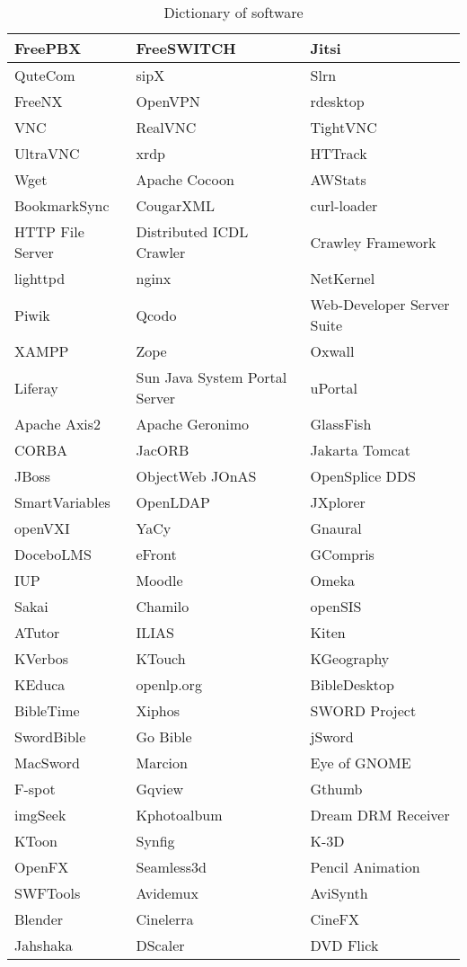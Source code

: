 \begin{table}
\begin{center}
\begin{tabular}{|l|l|l|}\hline
FreePBX&FreeSWITCH&Jitsi\\\hline
QuteCom&sipX&Slrn\\\hline
FreeNX&OpenVPN&rdesktop\\\hline
VNC&RealVNC&TightVNC\\\hline
UltraVNC&xrdp&HTTrack\\\hline
Wget&Apache Cocoon&AWStats\\\hline
BookmarkSync&CougarXML&curl-loader\\\hline
HTTP File Server&Distributed ICDL Crawler&Crawley Framework\\\hline
lighttpd&nginx&NetKernel\\\hline
Piwik&Qcodo&Web-Developer Server Suite\\\hline
XAMPP&Zope&Oxwall\\\hline
Liferay&Sun Java System Portal Server&uPortal\\\hline
Apache Axis2&Apache Geronimo&GlassFish\\\hline
CORBA&JacORB&Jakarta Tomcat\\\hline
JBoss&ObjectWeb JOnAS&OpenSplice DDS\\\hline
SmartVariables&OpenLDAP&JXplorer\\\hline
openVXI&YaCy&Gnaural\\\hline
DoceboLMS&eFront&GCompris\\\hline
IUP&Moodle&Omeka\\\hline
Sakai&Chamilo&openSIS\\\hline
ATutor&ILIAS&Kiten\\\hline
KVerbos&KTouch&KGeography\\\hline
KEduca&openlp.org&BibleDesktop\\\hline
BibleTime&Xiphos&SWORD Project\\\hline
SwordBible&Go Bible&jSword\\\hline
MacSword&Marcion&Eye of GNOME\\\hline
F-spot&Gqview&Gthumb\\\hline
imgSeek&Kphotoalbum&Dream DRM Receiver\\\hline
KToon&Synfig&K-3D\\\hline
OpenFX&Seamless3d&Pencil Animation\\\hline
SWFTools&Avidemux&AviSynth\\\hline
Blender&Cinelerra&CineFX\\\hline
Jahshaka&DScaler&DVD Flick\\\hline
\end{tabular}
\end{center}
\caption{Dictionary of software}
\end{table}
